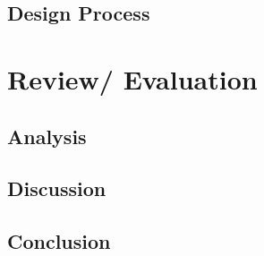 \documentclass[UKenglish]{ifimaster}
\begin{document}
\chapter{ Design Process}



\part{Review/ Evaluation }

\chapter{ Analysis}


\chapter{ Discussion}


\chapter{ Conclusion}


\backmatter{}

\printbibliography[nottype=online]
\printbibliography[type=online,title={Web sources}]

% 
\end{document}
